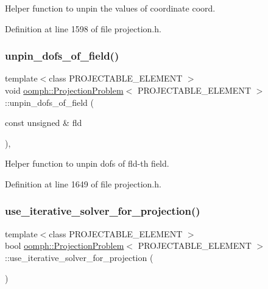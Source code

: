 Helper function to unpin the values of coordinate coord. 



Definition at line 1598 of file projection.\+h.

\mbox{\label{classoomph_1_1ProjectionProblem_a36847f48bff4081b5db0c038ddba1260}} 
\subsubsection{\texorpdfstring{unpin\+\_\+dofs\+\_\+of\+\_\+field()}{unpin\_dofs\_of\_field()}}
{\footnotesize\ttfamily template$<$class P\+R\+O\+J\+E\+C\+T\+A\+B\+L\+E\+\_\+\+E\+L\+E\+M\+E\+NT $>$ \\
void \hyperlink{classoomph_1_1ProjectionProblem}{oomph\+::\+Projection\+Problem}$<$ P\+R\+O\+J\+E\+C\+T\+A\+B\+L\+E\+\_\+\+E\+L\+E\+M\+E\+NT $>$\+::unpin\+\_\+dofs\+\_\+of\+\_\+field (\begin{DoxyParamCaption}\item[{const unsigned \&}]{fld }\end{DoxyParamCaption})\hspace{0.3cm}{\ttfamily [inline]}, {\ttfamily [private]}}



Helper function to unpin dofs of fld-\/th field. 



Definition at line 1649 of file projection.\+h.

\mbox{\label{classoomph_1_1ProjectionProblem_a5652035eda34f398652ede076dc085ae}} 
\subsubsection{\texorpdfstring{use\+\_\+iterative\+\_\+solver\+\_\+for\+\_\+projection()}{use\_iterative\_solver\_for\_projection()}}
{\footnotesize\ttfamily template$<$class P\+R\+O\+J\+E\+C\+T\+A\+B\+L\+E\+\_\+\+E\+L\+E\+M\+E\+NT $>$ \\
bool \hyperlink{classoomph_1_1ProjectionProblem}{oomph\+::\+Projection\+Problem}$<$ P\+R\+O\+J\+E\+C\+T\+A\+B\+L\+E\+\_\+\+E\+L\+E\+M\+E\+NT $>$\+::use\+\_\+iterative\+\_\+solver\+\_\+for\+\_\+projection (\begin{DoxyParamCaption}{ }\end{DoxyParamCaption})\hspace{0.3cm}{\ttfamily [inline]}}

